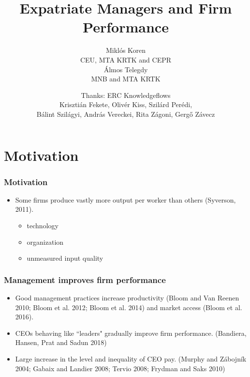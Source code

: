 \documentclass[aspectratio=169,compress,mathserif]{beamer}
\title{Expatriate Managers and Firm Performance}
\author{Miklós Koren\\
CEU, MTA KRTK and CEPR\\
Álmos Telegdy\\
MNB and MTA KRTK}
\date %
{Thanks: ERC Knowledgeflows\\Krisztián Fekete, Olivér Kiss, Szilárd Perédi,\\ Bálint Szilágyi, András Vereckei, Rita Zágoni, Gergő Závecz}
\begin{document}
\begin{frame}[plain]
  \titlepage
    \addtocounter{framenumber}{-1}
\end{frame}






\section{Motivation}\hypertarget{Motivation}{}
\begin{frame}\frametitle{Motivation}\hypertarget{Motivation}{}
\begin{itemize}
\item Some firms produce vastly more output per worker than others (Syverson, 2011).
\begin{itemize}
\item technology

\item organization

\item unmeasured input quality




\end{itemize}

\end{itemize}
\end{frame}



\begin{frame}\frametitle{Management improves firm performance}\hypertarget{Management improves firm performance}{}
\begin{itemize}
\item Good management practices  increase  productivity  (Bloom  and  Van  Reenen  2010;  Bloom  et  al.  2012;  Bloom  et  al.  2014) and market access (Bloom et al. 2016). 

\item CEOs behaving like ``leaders" gradually improve firm performance. (Bandiera, Hansen, Prat and Sadun 2018)

\item Large increase  in  the  level  and  inequality  of  CEO  pay.  (Murphy  and  Zábojník  2004;  Gabaix  and  Landier  2008;  Tervio  2008; Frydman and Saks 2010)


\end{itemize}
\end{frame}
\end{document}
